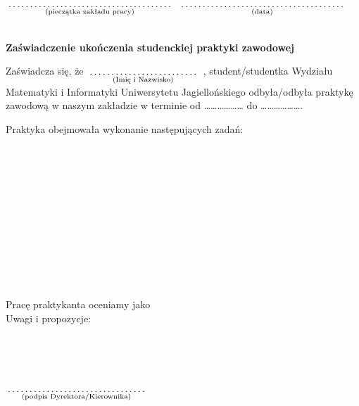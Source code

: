 \documentclass[a4paper,11pt]{article}
\newcommand{\fillField}[2]{
    $\underset{\text{#1}}{\parbox[t]{#2}{\dotfill}}$
}
\begin{document}
\noindent
\fillField{(pieczątka zakładu pracy)}{6cm} \hfill \fillField{(data)}{6cm} \\\\

\vskip 1.0cm
\begin{center}
{\Large \textbf{Zaświadczenie ukończenia studenckiej praktyki zawodowej}}
\end{center}
\vskip 0.5cm


\noindent
Zaświadcza się, że \fillField{(Imię i Nazwisko)}{4cm}, student/studentka Wydziału Matematyki i Informatyki Uniwersytetu Jagiellońskiego odbyła/odbyła praktykę zawodową w naszym zakładzie w terminie od ……………… do ……………….

\noindent
Praktyka obejmowała wykonanie następujących zadań: \\
\phantom{a}\dotfill \\
\phantom{a}\dotfill \\
\phantom{a}\dotfill \\
\phantom{a}\dotfill \\
\phantom{a}\dotfill \\
\phantom{a}\dotfill \\
\phantom{a}\dotfill \\
\phantom{a}\dotfill \\
\phantom{a}\dotfill \\
\phantom{a}\dotfill \\
\phantom{a}\dotfill \\
\phantom{a}\dotfill 


\noindent
Pracę praktykanta oceniamy jako \dotfill \\
Uwagi i propozycje: \dotfill \\
\phantom{a}\dotfill \\
\phantom{a}\dotfill \\
\phantom{a}\dotfill \\
\phantom{a}\dotfill \\
\phantom{a}\dotfill 

\vskip 1.2cm
\hspace{\fill} \fillField{(podpis Dyrektora/Kierownika)}{5cm} \hspace{2.0cm}
\end{document}
